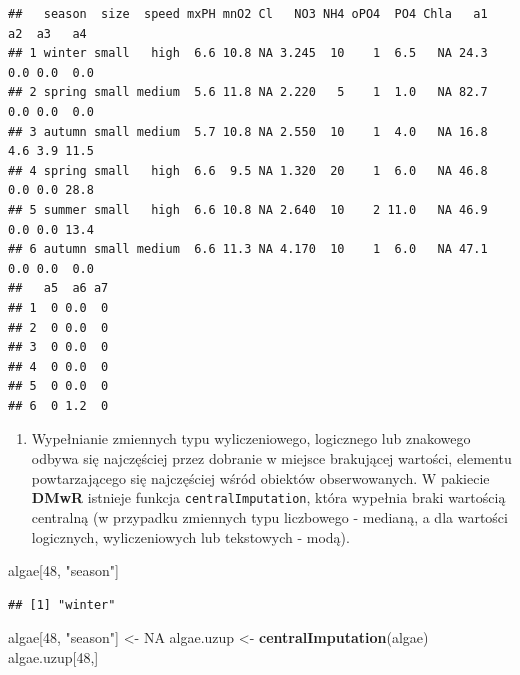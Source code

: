 \documentclass[
]{book}
\newenvironment{Shaded}{\begin{snugshade}}{\end{snugshade}}
\newcommand{\AttributeTok}[1]{\textcolor[rgb]{0.13,0.29,0.53}{#1}}
\newcommand{\ConstantTok}[1]{\textcolor[rgb]{0.56,0.35,0.01}{#1}}
\newcommand{\DecValTok}[1]{\textcolor[rgb]{0.00,0.00,0.81}{#1}}
\newcommand{\FunctionTok}[1]{\textcolor[rgb]{0.13,0.29,0.53}{\textbf{#1}}}
\newcommand{\NormalTok}[1]{#1}
\newcommand{\OtherTok}[1]{\textcolor[rgb]{0.56,0.35,0.01}{#1}}
\newcommand{\SpecialCharTok}[1]{\textcolor[rgb]{0.81,0.36,0.00}{\textbf{#1}}}
\newcommand{\StringTok}[1]{\textcolor[rgb]{0.31,0.60,0.02}{#1}}
\providecommand{\tightlist}{%
  \setlength{\itemsep}{0pt}\setlength{\parskip}{0pt}}
\theoremstyle{plain}
\theoremstyle{definition}
\theoremstyle{definition}
\theoremstyle{definition}
\theoremstyle{definition}
\theoremstyle{definition}
\theoremstyle{remark}
\begin{document}
\begin{verbatim}
##   season  size  speed mxPH mnO2 Cl   NO3 NH4 oPO4  PO4 Chla   a1  a2  a3   a4
## 1 winter small   high  6.6 10.8 NA 3.245  10    1  6.5   NA 24.3 0.0 0.0  0.0
## 2 spring small medium  5.6 11.8 NA 2.220   5    1  1.0   NA 82.7 0.0 0.0  0.0
## 3 autumn small medium  5.7 10.8 NA 2.550  10    1  4.0   NA 16.8 4.6 3.9 11.5
## 4 spring small   high  6.6  9.5 NA 1.320  20    1  6.0   NA 46.8 0.0 0.0 28.8
## 5 summer small   high  6.6 10.8 NA 2.640  10    2 11.0   NA 46.9 0.0 0.0 13.4
## 6 autumn small medium  6.6 11.3 NA 4.170  10    1  6.0   NA 47.1 0.0 0.0  0.0
##   a5  a6 a7
## 1  0 0.0  0
## 2  0 0.0  0
## 3  0 0.0  0
## 4  0 0.0  0
## 5  0 0.0  0
## 6  0 1.2  0
\end{verbatim}

\begin{Shaded}
\end{Shaded}

\begin{enumerate}
\def\labelenumi{\arabic{enumi}.}
\setcounter{enumi}{2}
\tightlist
\item
  Wypełnianie zmiennych typu wyliczeniowego, logicznego lub znakowego odbywa się najczęściej przez dobranie w miejsce brakującej wartości, elementu powtarzającego się najczęściej wśród obiektów obserwowanych. W pakiecie \textbf{DMwR} istnieje funkcja \texttt{centralImputation}, która wypełnia braki wartością centralną (w przypadku zmiennych typu liczbowego - medianą, a dla wartości logicznych, wyliczeniowych lub tekstowych - modą).
\end{enumerate}

\begin{Shaded}
\begin{Highlighting}[]
\NormalTok{algae[}\DecValTok{48}\NormalTok{, }\StringTok{"season"}\NormalTok{]}
\end{Highlighting}
\end{Shaded}

\begin{verbatim}
## [1] "winter"
\end{verbatim}

\begin{Shaded}
\begin{Highlighting}[]
\NormalTok{algae[}\DecValTok{48}\NormalTok{, }\StringTok{"season"}\NormalTok{] }\OtherTok{\textless{}{-}} \ConstantTok{NA}
\NormalTok{algae.uzup }\OtherTok{\textless{}{-}} \FunctionTok{centralImputation}\NormalTok{(algae)}
\NormalTok{algae.uzup[}\DecValTok{48}\NormalTok{,]}
\end{Highlighting}
\end{Shaded}
\end{document}
